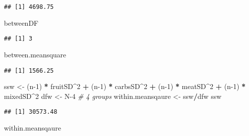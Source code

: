 \documentclass[
]{article}
\newenvironment{Shaded}{\begin{snugshade}}{\end{snugshade}}
\newcommand{\CommentTok}[1]{\textcolor[rgb]{0.56,0.35,0.01}{\textit{#1}}}
\newcommand{\DecValTok}[1]{\textcolor[rgb]{0.00,0.00,0.81}{#1}}
\newcommand{\NormalTok}[1]{#1}
\newcommand{\OtherTok}[1]{\textcolor[rgb]{0.56,0.35,0.01}{#1}}
\newcommand{\SpecialCharTok}[1]{\textcolor[rgb]{0.81,0.36,0.00}{\textbf{#1}}}
\begin{document}
\begin{verbatim}
## [1] 4698.75
\end{verbatim}

\begin{Shaded}
\begin{Highlighting}[]
\NormalTok{betweenDF}
\end{Highlighting}
\end{Shaded}

\begin{verbatim}
## [1] 3
\end{verbatim}

\begin{Shaded}
\begin{Highlighting}[]
\NormalTok{between.meansquare}
\end{Highlighting}
\end{Shaded}

\begin{verbatim}
## [1] 1566.25
\end{verbatim}

\begin{Shaded}
\begin{Highlighting}[]
\NormalTok{ssw }\OtherTok{\textless{}{-}}\NormalTok{ (n}\DecValTok{{-}1}\NormalTok{) }\SpecialCharTok{*}\NormalTok{ fruitSD}\SpecialCharTok{\^{}}\DecValTok{2} \SpecialCharTok{+}\NormalTok{ (n}\DecValTok{{-}1}\NormalTok{) }\SpecialCharTok{*}\NormalTok{ carbsSD}\SpecialCharTok{\^{}}\DecValTok{2} \SpecialCharTok{+}\NormalTok{ (n}\DecValTok{{-}1}\NormalTok{) }\SpecialCharTok{*}\NormalTok{ meatSD}\SpecialCharTok{\^{}}\DecValTok{2} \SpecialCharTok{+}\NormalTok{ (n}\DecValTok{{-}1}\NormalTok{) }\SpecialCharTok{*}\NormalTok{ mixedSD}\SpecialCharTok{\^{}}\DecValTok{2}
\NormalTok{dfw }\OtherTok{\textless{}{-}}\NormalTok{ N}\DecValTok{{-}4} \CommentTok{\# 4 groups}
\NormalTok{within.meansqaure }\OtherTok{\textless{}{-}}\NormalTok{ ssw}\SpecialCharTok{/}\NormalTok{dfw}
\NormalTok{ssw}
\end{Highlighting}
\end{Shaded}

\begin{verbatim}
## [1] 30573.48
\end{verbatim}

\begin{Shaded}
\begin{Highlighting}[]
\NormalTok{within.meansqaure}
\end{Highlighting}
\end{Shaded}
\end{document}
